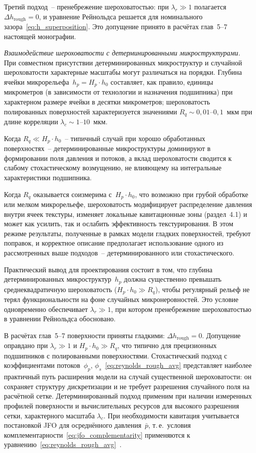 Третий подход~-- пренебрежение шероховатостью: при $\lambda_r \gg 1$
полагается $\Delta h_{\mathrm{rough}} = 0$, и уравнение Рейнольдса
решается для номинального зазора~\eqref{eq:h_superposition}. Это
допущение принято в расчётах глав~5--7 настоящей монографии.

\textit{Взаимодействие шероховатости с детерминированными
микроструктурами.}
При совместном присутствии детерминированных микроструктур
и случайной шероховатости характерные масштабы могут различаться
на порядки. Глубина ячейки микрорельефа~$h_p = H_p \cdot h_0$
составляет, как правило, единицы микрометров (в зависимости от технологии и назначения подшипника) при характерном размере
ячейки в десятки микрометров; шероховатость полированных
поверхностей характеризуется значениями $R_q \sim 0{,}01\text{--}0{,}1$~мкм
при длине корреляции $\lambda_c \sim 1\text{--}10$~мкм.

Когда $R_q \ll H_p \cdot h_0$~-- типичный случай при хорошо
обработанных поверхностях~-- детерминированные микроструктуры
доминируют в формировании поля давления и потоков, а вклад
шероховатости сводится к слабому стохастическому возмущению,
не влияющему на интегральные характеристики подшипника.

Когда $R_q$ оказывается соизмерима с~$H_p \cdot h_0$, что
возможно при грубой обработке или мелком микрорельефе,
шероховатость модифицирует распределение давления внутри ячеек
текстуры, изменяет локальные кавитационные зоны
(раздел~4.1) и может как усилить, так и ослабить эффективность
текстурирования. В этом режиме результаты, полученные в рамках
модели гладких поверхностей, требуют поправок, и корректное
описание предполагает использование одного из рассмотренных выше
подходов~-- детерминированного или стохастического.

Практический вывод для проектирования состоит в том, что
глубина детерминированных микроструктур~$h_p$ должна существенно
превышать среднеквадратичную шероховатость ($H_p \cdot h_0 \gg R_q$),
чтобы регулярный рельеф не терял функциональности на фоне случайных
микронеровностей. Это условие одновременно обеспечивает
$\lambda_r \gg 1$, при котором пренебрежение шероховатостью
в уравнении Рейнольдса обосновано.

В расчётах глав~5--7 поверхности приняты гладкими:
$\Delta h_{\mathrm{rough}} = 0$. Допущение оправдано при
$\lambda_r \gg 1$ и $H_p \cdot h_0 \gg R_q$, что типично
для прецизионных подшипников с полированными поверхностями.
Стохастический подход с коэффициентами потоков~$\phi_p$,
$\phi_s$~\eqref{eq:reynolds_rough_avg} представляет наиболее
практичный путь расширения модели на случай существенной
шероховатости: он сохраняет структуру дискретизации и не требует
разрешения случайного поля на расчётной сетке.
Детерминированный подход применим при наличии измеренных профилей
поверхности и вычислительных ресурсов для высокого разрешения
сетки, характерного масштаба $\lambda_c$.
При необходимости кавитация учитывается постановкой JFO для осреднённого давления~$\bar{p}$, т.\,е.\ условия комплементарности~\eqref{eq:jfo_complementarity} применяются к уравнению~\eqref{eq:reynolds_rough_avg}~\cite{gu2017,nie2022}.

